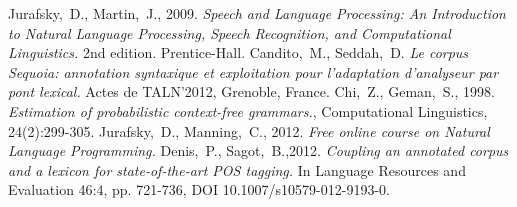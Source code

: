 \documentclass[12pt]{article}
\begin{document}
\begin{thebibliography}{9}
    Jurafsky,~D., Martin,~J., 2009. \emph{Speech and Language Processing: An Introduction to Natural Language Processing, Speech Recognition, and Computational Linguistics.} 2nd edition. Prentice-Hall.
    Candito,~M., Seddah,~D.
    \emph{Le corpus Sequoia: annotation syntaxique et exploitation pour
    l'adaptation d'analyseur par pont lexical.} Actes de TALN'2012, Grenoble,
    France.
    Chi,~Z., Geman,~S., 1998.
    \emph{Estimation of probabilistic context-free grammars.}, Computational Linguistics, 24(2):299-305.
    Jurafsky,~D., Manning,~C., 2012. \emph{Free online course on Natural
    Language Programming.}
    Denis,~P., Sagot,~B.,2012.
    \emph{Coupling an annotated corpus and a lexicon for state-of-the-art POS
    tagging.} In Language Resources and Evaluation 46:4, pp. 721-736,
    DOI 10.1007/s10579-012-9193-0.
    
\end{thebibliography}
\end{document}
